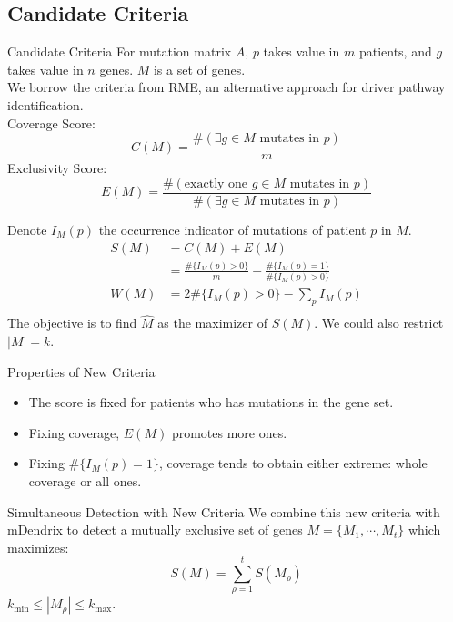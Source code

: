 \documentclass[xcolor=dvipsnames]{beamer}
\begin{document}
\subsection{Candidate Criteria}
\begin{frame}{Candidate Criteria}
For mutation matrix $A$, $p$ takes value in $m$ patients, and $g$ takes value in $n$ genes. $M$ is a set of genes.\\
We borrow the criteria from RME, an alternative approach for driver pathway identification.\\
Coverage Score:\\
\[C(M)=\frac{\#(\exists g\in M \text{ mutates in }p)}{m}\]
Exclusivity Score:\\
\[E(M)=\frac{\#(\text{exactly one } g\in M \text{ mutates in }p)}{\#(\exists g\in M \text{ mutates in }p)}\]
\end{frame}
\begin{frame}
Denote $I_M(p)$ the occurrence indicator of mutations of patient $p$ in $M$.\\
\begin{equation}
\begin{split}
S(M)&=C(M)+E(M)\\
&=\frac{\#\{I_M(p)>0\}}{m}+\frac{\#\{I_M(p)=1\}}{\#\{I_M(p)>0\}}\\
W(M)&=2\#\{I_M(p)>0\}-\sum_pI_M(p)\\
\end{split}
\end{equation}
The objective is to find $\hat{M}$ as the maximizer of $S(M)$. We could also restrict $|M|=k$.\\
\end{frame}
\begin{frame}{Properties of New Criteria}
\begin{itemize}
\item The score is fixed for patients who has mutations in the gene set.\\
\item Fixing coverage, $E(M)$ promotes more ones.\\
\item Fixing $\#\{I_M(p)=1\}$, coverage tends to obtain either extreme: whole coverage or all ones.\\
\end{itemize}
\end{frame}
\begin{frame}{Simultaneous Detection with New Criteria}
We combine this new criteria with mDendrix to detect a mutually exclusive set of genes $M=\{M_1,\cdots,M_t\}$ which maximizes:
\[
S(M)=\sum_{\rho=1}^t S(M_{\rho})
\]
$k_{\min}\leqslant |M_{\rho}|\leqslant k_{\max}$.\\
\end{frame}
\end{document}
